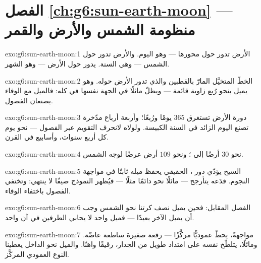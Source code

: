 \section*{الفصل \ref{ch:g6:sun-earth-moon} --- منظومة الشمس والأرض والقمر}

\begin{solution}{exo:g6:sun-earth-moon:1}
الأرض تدور حول محورها --- وهو اليوم. والأرض تدور حول الشمس ---
وهي السنة.  يدور حول الأرض --- وهو الشهر.
\end{solution}

\begin{solution}{exo:g6:sun-earth-moon:2}
الخطّ المتخيَّل المارّ بالقطبين والذي تدور الأرض حوله. وهو يميل
بنحو رُبع زاوية قائمة --- ويظلّ مائلًا في الجهة نفسها في 
كله: فالميل مع الوفاء يصنعان الفصول.
\end{solution}

\begin{solution}{exo:g6:sun-earth-moon:3}
دورة الأرض تستغرق $365$ يومًا ورُبعًا؛ وأربعة أرباع مدّخرة تصنع
اليوم الزائد في السنة الكبيسة. ولولاه لانحرف التقويم عبر الفصول
--- نحو يوم كل أربع سنوات، وأسابيع في القرن.
\end{solution}

\begin{solution}{exo:g6:sun-earth-moon:4}
نحو $30$ أرضًا إلى ؛ ونحو $109$ أرض عرضًا لوجه الشمس.
\end{solution}

\begin{solution}{exo:g6:sun-earth-moon:5}
السيخ يؤدّي دور ،  الحقيقي يحفظ ميله ثابتًا في
مواجهة النجوم. فدَعه يتأرجح --- مائلًا نحو  دائمًا مثلًا
--- فيُظهر النموذج صيفًا لا ينتهي: وتختفي الفصول باختفاء
الوفاء.
\end{solution}

\begin{solution}{exo:g6:sun-earth-moon:6}
الفصل المقابل: فحين يميل نصف كرتنا نحو الشمس وجب أن يميل الآخر
بعيدًا --- فميل واحد لا يحابي الطرفين في آن واحد.
\end{solution}

\begin{solution}{exo:g6:sun-earth-moon:7}
مواجهةً، يحطّ   عموديًّا مركَّزًا --- رقعة صغيرة
ساطعة عاضّة. ومائلًا، يتلطّخ  نفسه على امتداد طويل من
الجدار، رقيقًا واهنًا. والميل نحو الداخل يعطينا النوع العمودي
المركَّز.
\end{solution}

